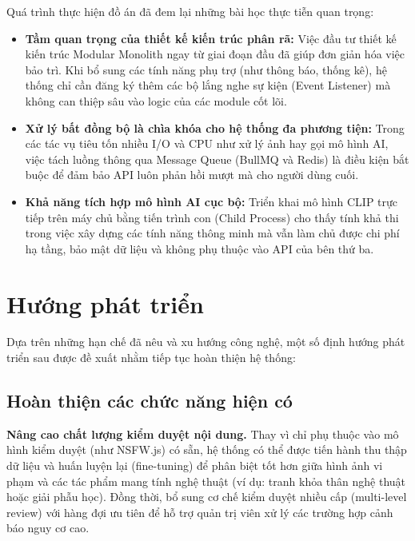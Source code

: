 Quá trình thực hiện đồ án đã đem lại những bài học thực tiễn quan trọng:

\begin{itemize}
    \item \textbf{Tầm quan trọng của thiết kế kiến trúc phân rã:} Việc đầu tư thiết kế kiến trúc Modular Monolith ngay từ giai đoạn đầu đã giúp đơn giản hóa việc bảo trì. Khi bổ sung các tính năng phụ trợ (như thông báo, thống kê), hệ thống chỉ cần đăng ký thêm các bộ lắng nghe sự kiện (Event Listener) mà không can thiệp sâu vào logic của các module cốt lõi.

    \item \textbf{Xử lý bất đồng bộ là chìa khóa cho hệ thống đa phương tiện:} Trong các tác vụ tiêu tốn nhiều I/O và CPU như xử lý ảnh hay gọi mô hình AI, việc tách luồng thông qua Message Queue (BullMQ và Redis) là điều kiện bắt buộc để đảm bảo API luôn phản hồi mượt mà cho người dùng cuối.

    \item \textbf{Khả năng tích hợp mô hình AI cục bộ:} Triển khai mô hình CLIP trực tiếp trên máy chủ bằng tiến trình con (Child Process) cho thấy tính khả thi trong việc xây dựng các tính năng thông minh mà vẫn làm chủ được chi phí hạ tầng, bảo mật dữ liệu và không phụ thuộc vào API của bên thứ ba.
\end{itemize}


\section{Hướng phát triển}

Dựa trên những hạn chế đã nêu và xu hướng công nghệ, một số định hướng phát triển sau được đề xuất nhằm tiếp tục hoàn thiện hệ thống:

\subsection{Hoàn thiện các chức năng hiện có}

\textbf{Nâng cao chất lượng kiểm duyệt nội dung.} Thay vì chỉ phụ thuộc vào mô hình kiểm duyệt (như NSFW.js) có sẵn, hệ thống có thể được tiến hành thu thập dữ liệu và huấn luyện lại (fine-tuning) để phân biệt tốt hơn giữa hình ảnh vi phạm và các tác phẩm mang tính nghệ thuật (ví dụ: tranh khỏa thân nghệ thuật hoặc giải phẫu học). Đồng thời, bổ sung cơ chế kiểm duyệt nhiều cấp (multi-level review) với hàng đợi ưu tiên để hỗ trợ quản trị viên xử lý các trường hợp cảnh báo nguy cơ cao.

